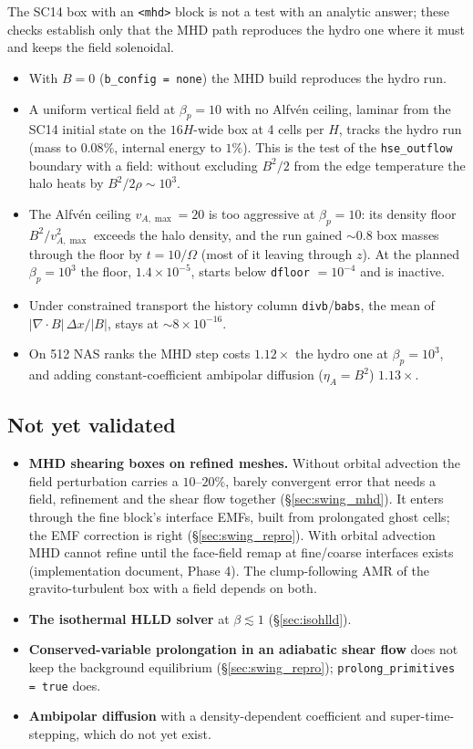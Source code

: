 \documentclass[11pt]{article}
\newcommand{\code}[1]{\texttt{#1}}
\begin{document}
The SC14 box with an \code{<mhd>} block is not a test with an analytic answer; these checks
establish only that the MHD path reproduces the hydro one where it must and keeps the field
solenoidal.
\begin{itemize}\itemsep2pt
\item With $B = 0$ (\code{b\_config = none}) the MHD build reproduces the hydro run.
\item A uniform vertical field at $\beta_p = 10$ with no Alfv\'en ceiling, laminar from the
      SC14 initial state on the $16H$-wide box at 4 cells per $H$, tracks the hydro run
      (mass to $0.08\%$, internal energy to $1\%$). This is the test of the
      \code{hse\_outflow} boundary with a field: without excluding $B^2/2$ from the edge
      temperature the halo heats by $B^2/2\rho \sim 10^3$.
\item The Alfv\'en ceiling $v_{A,\max} = 20$ is too aggressive at $\beta_p = 10$: its density
      floor $B^2/v_{A,\max}^2$ exceeds the halo density, and the run gained $\sim0.8$ box masses
      through the floor by $t = 10/\Omega$ (most of it leaving through $z$). At the planned
      $\beta_p = 10^3$ the floor, $1.4\times10^{-5}$, starts below \code{dfloor}
      $= 10^{-4}$ and is inactive.
\item Under constrained transport the history column \code{divb}/\code{babs}, the mean of
      $|\nabla\!\cdot\!B|\,\Delta x/|B|$, stays at $\sim8\times10^{-16}$.
\item On 512 NAS ranks the MHD step costs $1.12\times$ the hydro one at $\beta_p = 10^3$,
      and adding constant-coefficient ambipolar diffusion ($\eta_A = B^2$) $1.13\times$.
\end{itemize}

\subsection{Not yet validated}
\begin{itemize}\itemsep2pt
\item \textbf{MHD shearing boxes on refined meshes.} Without orbital advection the field
      perturbation carries a $10$--$20\%$, barely convergent error that needs a field,
      refinement and the shear flow together (\S\ref{sec:swing_mhd}). It enters through the
      fine block's interface EMFs, built from prolongated ghost cells; the EMF correction is
      right (\S\ref{sec:swing_repro}). With orbital advection
      MHD cannot refine until the face-field remap at fine/coarse interfaces exists
      (implementation document, Phase 4). The clump-following AMR of the gravito-turbulent
      box with a field depends on both.
\item \textbf{The isothermal HLLD solver} at $\beta \lesssim 1$ (\S\ref{sec:isohlld}).
\item \textbf{Conserved-variable prolongation in an adiabatic shear flow} does not keep the
      background equilibrium (\S\ref{sec:swing_repro}); \code{prolong\_primitives = true}
      does.
\item \textbf{Ambipolar diffusion} with a density-dependent coefficient and
      super-time-stepping, which do not yet exist.
\end{itemize}
\end{document}
